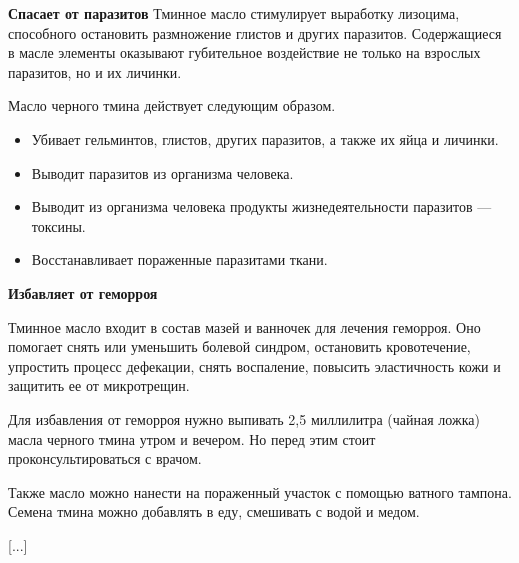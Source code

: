 \textbf{Спасает от паразитов}
Тминное масло стимулирует выработку лизоцима, способного остановить размножение глистов и других паразитов. Содержащиеся в масле элементы оказывают губительное воздействие не только на взрослых паразитов, но и их личинки.

Масло черного тмина действует следующим образом.

\begin{itemize}
    \item Убивает гельминтов, глистов, других паразитов, а также их яйца и личинки.
    \item Выводит паразитов из организма человека.
    \item Выводит из организма человека продукты жизнедеятельности паразитов — токсины.
    \item Восстанавливает пораженные паразитами ткани.
\end{itemize}

\textbf{Избавляет от геморроя}

Тминное масло входит в состав мазей и ванночек для лечения геморроя. Оно помогает снять или уменьшить болевой синдром, остановить кровотечение, упростить процесс дефекации, снять воспаление, повысить эластичность кожи и защитить ее от микротрещин.

Для избавления от геморроя нужно выпивать 2,5 миллилитра (чайная ложка) масла черного тмина утром и вечером. Но перед этим стоит проконсультироваться с врачом.

Также масло можно нанести на пораженный участок с помощью ватного тампона. Семена тмина можно добавлять в еду, смешивать с водой и медом.

[...]
